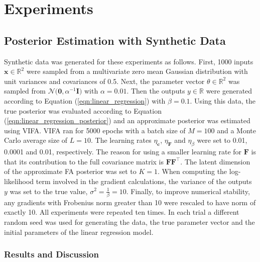 \documentclass[msc,deptreport.inf]{infthesis} %
\newcommand{\matr}[1]{\mathbf{#1}}
\newcommand{\R}{\mathbb R}
\begin{document}
\section{Experiments}

\subsection{Posterior Estimation with Synthetic Data}\label{sec:vifa_posterior_synthetic}

Synthetic data was generated for these experiments as follows. First, 1000 inputs $\matr{x} \in \R^2$ were sampled from a multivariate zero mean Gaussian distribution with unit variances and covariances of 0.5.
Next, the parameter vector $\theta \in \R^2$ was sampled from $\mathcal{N}\big(\matr{0}, \alpha^{-1} \matr{I} \big)$ with $\alpha = 0.01$. Then the outputs $y \in \R$ were generated according to Equation (\ref{eqn:linear_regression}) with $\beta = 0.1$. Using this data, the true posterior was evaluated according to Equation (\ref{eqn:linear_regression_posterior}) and an approximate posterior was estimated using VIFA. VIFA ran for 5000 epochs with a batch size of $M=100$ and a Monte Carlo average size of $L=10$.  The learning rates $\eta_\matr{c}$,  $\eta_\matr{F}$ and $\eta_\beta$ were set to 0.01, 0.0001 and 0.01, respectively. The reason for using a smaller learning rate for $\matr{F}$ is that its contribution to the full covariance matrix is $\matr{F}\matr{F}^\intercal$. The latent dimension of the approximate FA posterior was set to $K=1$. When computing the log-likelihood term involved in the gradient calculations, the variance of the outputs $y$ was set to the true value, $\sigma^2 = \frac{1}{\beta} = 10$. Finally, to improve numerical stability, any gradients with Frobenius norm greater than 10 were rescaled to have norm of exactly 10. All experiments were repeated ten times. In each trial a different random seed was used for generating the data, the true parameter vector and the initial parameters of the linear regression model. 

\subsubsection{Results and Discussion}
\end{document}
